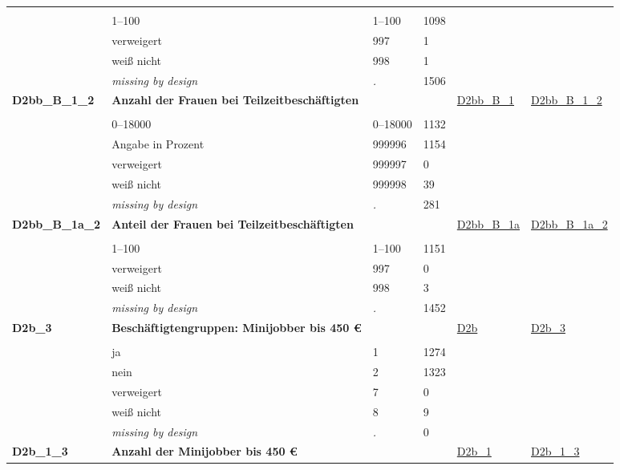 \begin{longtable}{| L{2.45cm} | L{6cm} | C{1.5cm} | R{1cm} | C{2.25cm} | C{2.25cm} |}
   &  &  &  &  &  \\ 
   & 1--100 & 1--100 & 1098 &  &  \\ 
   & verweigert & 997 & 1 &  &  \\ 
   & weiß nicht & 998 & 1 &  &  \\ 
   & \textit{missing by design} & \textit{.} & 1506 &  &  \\ 
   \midrule
\textbf{D2bb\_B\_1\_2}\label{var:D2bb:B:1:2} & \textbf{Anzahl der Frauen bei Teilzeitbeschäftigten} &  &  & \hyperref[D2bb:B:1]{D2bb\_B\_1} & \hyperref[var:suf:D2bb:B:1:2]{D2bb\_B\_1\_2} \\ 
   &  &  &  &  &  \\ 
   & 0--18000 & 0--18000 & 1132 &  &  \\ 
   & Angabe in Prozent & 999996 & 1154 &  &  \\ 
   & verweigert & 999997 & 0 &  &  \\ 
   & weiß nicht & 999998 & 39 &  &  \\ 
   & \textit{missing by design} & \textit{.} & 281 &  &  \\ 
   \midrule
\textbf{D2bb\_B\_1a\_2}\label{var:D2bb:B:1a:2} & \textbf{Anteil der Frauen bei Teilzeitbeschäftigten} &  &  & \hyperref[D2bb:B:1a]{D2bb\_B\_1a} & \hyperref[var:suf:D2bb:B:1a:2]{D2bb\_B\_1a\_2} \\ 
   &  &  &  &  &  \\ 
   & 1--100 & 1--100 & 1151 &  &  \\ 
   & verweigert & 997 & 0 &  &  \\ 
   & weiß nicht & 998 & 3 &  &  \\ 
   & \textit{missing by design} & \textit{.} & 1452 &  &  \\ 
   \midrule
\textbf{D2b\_3}\label{var:D2b:3} & \textbf{Beschäftigtengruppen: Minijobber bis 450 €} &  &  & \hyperref[D2b]{D2b} & \hyperref[var:suf:D2b:3]{D2b\_3} \\ 
   &  &  &  &  &  \\ 
   & ja & 1 & 1274 &  &  \\ 
   & nein & 2 & 1323 &  &  \\ 
   & verweigert & 7 & 0 &  &  \\ 
   & weiß nicht & 8 & 9 &  &  \\ 
   & \textit{missing by design} & \textit{.} & 0 &  &  \\ 
   \midrule
\textbf{D2b\_1\_3}\label{var:D2b:1:3} & \textbf{Anzahl der Minijobber bis 450 € } &  &  & \hyperref[D2b:1]{D2b\_1} & \hyperref[var:suf:D2b:1:3]{D2b\_1\_3} \\ 

\end{longtable}
